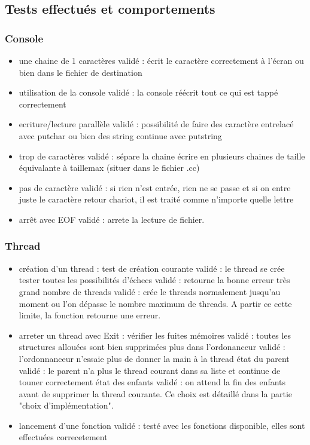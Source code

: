 \documentclass{article}
\begin{document}
	\subsection{Tests effectués et comportements}
		\subsubsection{Console}
			\begin{itemize}
				\item une chaine de 1 caractères 			validé : écrit le caractère	correctement à l'écran ou bien dans le fichier de destination
				\item utilisation de la console				validé : la console réécrit tout ce qui est tappé correctement
				\item ecriture/lecture parallèle			validé : possibilité de faire des caractère entrelacé avec putchar ou bien des string continue avec putstring
				\item trop de caractères					validé : sépare la chaine écrire en plusieurs chaines de taille équivalante à taillemax (situer dans le fichier .cc)
				\item pas de caractère 						validé : si rien n'est entrée, rien ne se passe et si on entre juste le caractère retour chariot, il est traité comme n'importe quelle lettre
				\item arrêt avec EOF 						validé : arrete la lecture de fichier.
			\end{itemize}

		\subsubsection{Thread}
			\begin{itemize}
				\item création d'un thread :
					\subitem test de création courante 				validé : le thread se crée
					\subitem tester toutes les possibilités d'échecs	validé : retourne la bonne erreur
					\subitem très grand nombre de threads 				validé : crée le threads normalement jusqu'au moment ou l'on dépasse le nombre maximum de threads. A partir ce cette limite, la fonction retourne une erreur.
				\item arreter un thread avec Exit :
					\subitem vérifier les fuites mémoires		validé : toutes les structures allouées sont bien supprimées
					\subitem plus dans l'ordonanceur			validé : l'ordonnanceur n'essaie plus de donner la main à la thread
					\subitem état du parent					validé : le parent n'a plus le thread courant dans sa liste et continue de touner correctement
					\subitem état des enfants					validé : on attend la fin des enfants avant de supprimer la thread courante. Ce choix est détaillé dans la partie "choix d'implémentation".
				\item lancement d'une fonction		validé : testé avec les fonctions disponible, elles sont effectuées correcetement
			\end{itemize}
\end{document}
